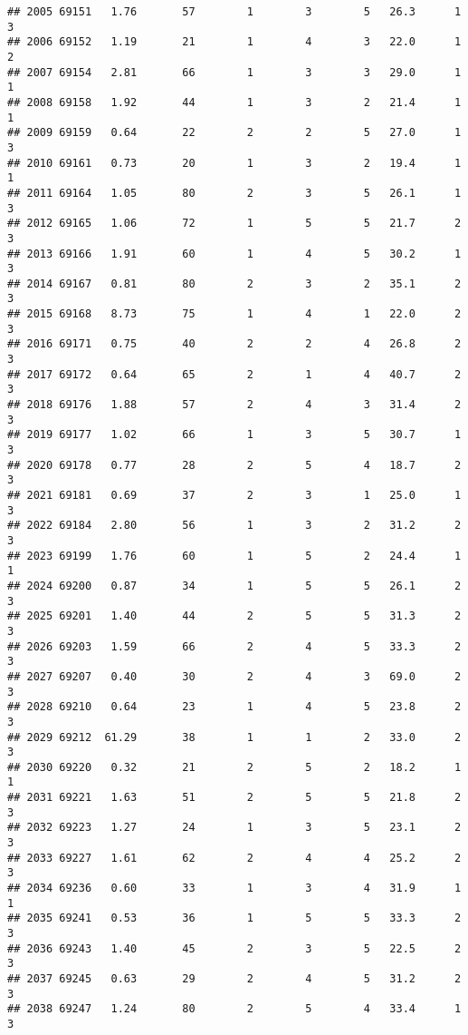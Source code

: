 \documentclass[
]{article}
\begin{document}
\begin{verbatim}
## 2005 69151   1.76       57        1        3        5   26.3      1      3
## 2006 69152   1.19       21        1        4        3   22.0      1      2
## 2007 69154   2.81       66        1        3        3   29.0      1      1
## 2008 69158   1.92       44        1        3        2   21.4      1      1
## 2009 69159   0.64       22        2        2        5   27.0      1      3
## 2010 69161   0.73       20        1        3        2   19.4      1      1
## 2011 69164   1.05       80        2        3        5   26.1      1      3
## 2012 69165   1.06       72        1        5        5   21.7      2      3
## 2013 69166   1.91       60        1        4        5   30.2      1      3
## 2014 69167   0.81       80        2        3        2   35.1      2      3
## 2015 69168   8.73       75        1        4        1   22.0      2      3
## 2016 69171   0.75       40        2        2        4   26.8      2      3
## 2017 69172   0.64       65        2        1        4   40.7      2      3
## 2018 69176   1.88       57        2        4        3   31.4      2      3
## 2019 69177   1.02       66        1        3        5   30.7      1      3
## 2020 69178   0.77       28        2        5        4   18.7      2      3
## 2021 69181   0.69       37        2        3        1   25.0      1      3
## 2022 69184   2.80       56        1        3        2   31.2      2      3
## 2023 69199   1.76       60        1        5        2   24.4      1      1
## 2024 69200   0.87       34        1        5        5   26.1      2      3
## 2025 69201   1.40       44        2        5        5   31.3      2      3
## 2026 69203   1.59       66        2        4        5   33.3      2      3
## 2027 69207   0.40       30        2        4        3   69.0      2      3
## 2028 69210   0.64       23        1        4        5   23.8      2      3
## 2029 69212  61.29       38        1        1        2   33.0      2      3
## 2030 69220   0.32       21        2        5        2   18.2      1      1
## 2031 69221   1.63       51        2        5        5   21.8      2      3
## 2032 69223   1.27       24        1        3        5   23.1      2      3
## 2033 69227   1.61       62        2        4        4   25.2      2      3
## 2034 69236   0.60       33        1        3        4   31.9      1      1
## 2035 69241   0.53       36        1        5        5   33.3      2      3
## 2036 69243   1.40       45        2        3        5   22.5      2      3
## 2037 69245   0.63       29        2        4        5   31.2      2      3
## 2038 69247   1.24       80        2        5        4   33.4      1      3

\end{verbatim}
\end{document}
